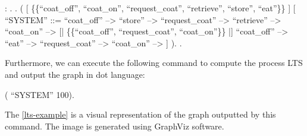 \begin{coqdoccode}
	\coqdocnoindent
	  : .\coqdoceol
	\coqdocnoindent
	.\coqdoceol
	\coqdocindent{1.00em}
	 (\coqdoceol
	\coqdocindent{2.00em}
	\coqdoceol
	\coqdocindent{2.00em}
	[  \{\{``coat\_off'', ``coat\_on'', ``request\_coat'', ``retrieve'', ``store'', ``eat''\}\} ]\coqdoceol
	\coqdocindent{2.00em}
	[ ``SYSTEM'' ::=\coqdoceol
	\coqdocindent{3.00em}
	``coat\_off'' --> ``store'' --> ``request\_coat'' --> ``retrieve'' --> ``coat\_on'' --> \coqdoceol
	\coqdocindent{3.00em}
	[| \{\{``coat\_off'', ``request\_coat'', ``coat\_on''\}\} |]\coqdoceol
	\coqdocindent{3.00em}
	``coat\_off'' --> ``eat'' --> ``request\_coat'' --> ``coat\_on'' -->  ]\coqdoceol
	\coqdocindent{1.00em}
	).\coqdoceol
	\coqdocnoindent
	.\coqdoceol
\end{coqdoccode}

Furthermore, we can execute the following command to compute the process LTS and output the graph in dot language:

\begin{coqdoccode}
	\coqdocnoindent
	  (  ``SYSTEM'' 100).\coqdoceol
\end{coqdoccode}

The \autoref{lts-example} is a visual representation of the graph outputted by this command. The image is generated using GraphViz software.

